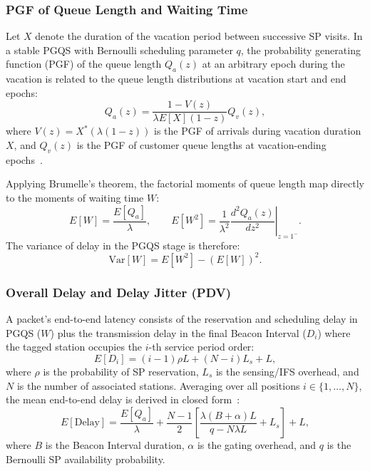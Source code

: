\subsubsection{PGF of Queue Length and Waiting Time}
Let $X$ denote the duration of the vacation period between successive SP visits. In a stable PGQS with Bernoulli scheduling parameter $q$, the probability generating function (PGF) of the queue length $Q_a(z)$ at an arbitrary epoch during the vacation is related to the queue length distributions at vacation start and end epochs:
\begin{equation}
    Q_a(z) = \frac{1 - V(z)}{\lambda E[X](1 - z)} Q_v(z),
\end{equation}
where $V(z) = X^*(\lambda(1 - z))$ is the PGF of arrivals during vacation duration $X$, and $Q_v(z)$ is the PGF of customer queue lengths at vacation-ending epochs~\cite{hemanth2019tett}.

Applying Brumelle's theorem, the factorial moments of queue length map directly to the moments of waiting time $W$:
\begin{equation}
    E[W] = \frac{E[Q_a]}{\lambda}, \qquad E[W^2] = \frac{1}{\lambda^2} \left. \frac{d^2 Q_a(z)}{dz^2} \right|_{z=1^-}.
\end{equation}
The variance of delay in the PGQS stage is therefore:
\begin{equation}
    \mathrm{Var}[W] = E[W^2] - (E[W])^2.
\end{equation}

\subsubsection{Overall Delay and Delay Jitter (PDV)}
A packet's end-to-end latency consists of the reservation and scheduling delay in PGQS ($W$) plus the transmission delay in the final Beacon Interval ($D_i$) where the tagged station occupies the $i$-th service period order:
\begin{equation}
    E[D_i] = (i - 1)\rho L + (N - i)L_s + L,
\end{equation}
where $\rho$ is the probability of SP reservation, $L_s$ is the sensing/IFS overhead, and $N$ is the number of associated stations. Averaging over all positions $i \in \{1, \dots, N\}$, the mean end-to-end delay is derived in closed form~\cite{hemanth2019tett}:
\begin{equation}
    E[\text{Delay}] = \frac{E[Q_a]}{\lambda} + \frac{N - 1}{2}\left[ \frac{\lambda(B + \alpha)L}{q - N\lambda L} + L_s \right] + L,
\end{equation}
where $B$ is the Beacon Interval duration, $\alpha$ is the gating overhead, and $q$ is the Bernoulli SP availability probability.

